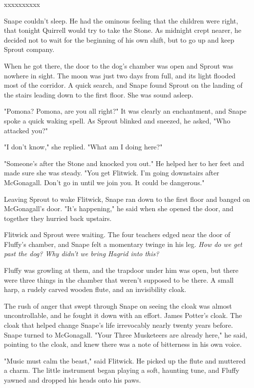 \documentclass[a4paper,11pt]{article}
\begin{document}
xxxxxxxxxx

Snape couldn't sleep. He had the ominous feeling that the children were right, that tonight Quirrell would try to take the Stone. As midnight crept nearer, he decided not to wait for the beginning of his own shift, but to go up and keep Sprout company.

When he got there, the door to the dog's chamber was open and Sprout was nowhere in sight. The moon was just two days from full, and its light flooded most of the corridor. A quick search, and Snape found Sprout on the landing of the stairs leading down to the first floor. She was sound asleep.

"Pomona? Pomona, are you all right?" It was clearly an enchantment, and Snape spoke a quick waking spell. As Sprout blinked and sneezed, he asked, "Who attacked you?"

"I don't know," she replied. "What am I doing here?"

"Someone's after the Stone and knocked you out." He helped her to her feet and made sure she was steady. "You get Flitwick. I'm going downstairs after McGonagall. Don't go in until we join you. It could be dangerous."

Leaving Sprout to wake Flitwick, Snape ran down to the first floor and banged on McGonagall's door. "It's happening," he said when she opened the door, and together they hurried back upstairs.

Flitwick and Sprout were waiting. The four teachers edged near the door of Fluffy's chamber, and Snape felt a momentary twinge in his leg. \emph{How do we get past the dog? Why didn't we bring Hagrid into this?}

Fluffy was growling at them, and the trapdoor under him was open, but there were three things in the chamber that weren't supposed to be there. A small harp, a rudely carved wooden flute, and an invisibility cloak.

The rush of anger that swept through Snape on seeing the cloak was almost uncontrollable, and he fought it down with an effort. James Potter's cloak. The cloak that helped change Snape's life irrevocably nearly twenty years before. Snape turned to McGonagall. "Your Three Musketeers are already here," he said, pointing to the cloak, and knew there was a note of bitterness in his own voice.

"Music must calm the beast," said Flitwick. He picked up the flute and muttered a charm. The little instrument began playing a soft, haunting tune, and Fluffy yawned and dropped his heads onto his paws.
\end{document}
